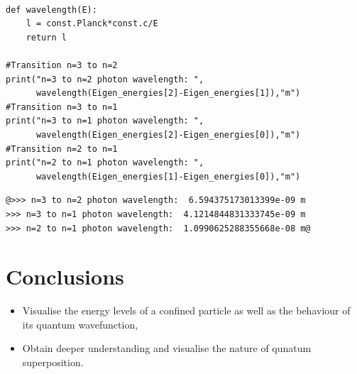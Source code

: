 \begin{listing}
\begin{verbatim}

def wavelength(E):
    l = const.Planck*const.c/E
    return l

#Transition n=3 to n=2
print("n=3 to n=2 photon wavelength: ", 
      wavelength(Eigen_energies[2]-Eigen_energies[1]),"m")
#Transition n=3 to n=1
print("n=3 to n=1 photon wavelength: ", 
      wavelength(Eigen_energies[2]-Eigen_energies[0]),"m")
#Transition n=2 to n=1
print("n=2 to n=1 photon wavelength: ", 
      wavelength(Eigen_energies[1]-Eigen_energies[0]),"m")
\end{verbatim}
\end{listing}

\begin{lstlisting}[frame=single,style=base,backgroundcolor=\color{black}, basicstyle=\small]
@>>> n=3 to n=2 photon wavelength:  6.594375173013399e-09 m
>>> n=3 to n=1 photon wavelength:  4.1214844831333745e-09 m
>>> n=2 to n=1 photon wavelength:  1.0990625288355668e-08 m@
\end{lstlisting}


\section{Conclusions}

\begin{itemize}
    \item Visualise the energy levels of a confined particle as well as the behaviour of its quantum wavefunction,
    \item Obtain deeper understanding and visualise the nature of qunatum superposition.
\end{itemize}